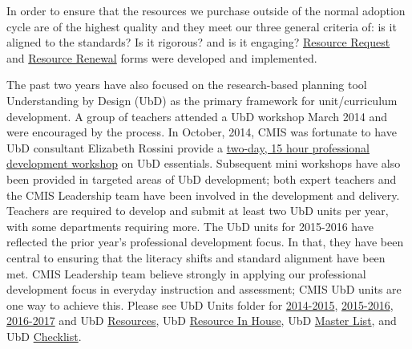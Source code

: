 \documentclass{report}
\begin{document}
\begin{findings}
In order to ensure that the resources we purchase outside of the normal adoption cycle are of the highest quality and they meet our three general criteria of: is it aligned to the standards? Is it rigorous? and is it engaging? \href{https://goo.gl/forms/715q4GLbzFj9JRPZ2}{Resource Request} and \href{https://goo.gl/forms/N2Oow0UnpUr7bOzw1}{Resource Renewal} forms were developed and implemented. 


The past two years have also focused on the research-based planning tool Understanding by Design (UbD) as the primary framework for unit/curriculum development. A group of teachers attended a UbD workshop March 2014 and were encouraged by the process. In October, 2014, CMIS was fortunate to have UbD consultant Elizabeth Rossini provide a \href{https://drive.google.com/drive/folders/0ByVFfrm0zfolbDlqWjhobkhDZkk?usp=sharing}{two-day, 15 hour professional development workshop} on UbD essentials. Subsequent mini workshops have also been provided in targeted areas of UbD development; both expert teachers and the CMIS Leadership team have been involved in the development and delivery. Teachers are required to develop and submit at least two UbD units per year, with some departments requiring more. The UbD units for 2015-2016 have reflected the prior year’s professional development focus. In that, they have been central to ensuring that the literacy shifts and standard alignment have been met. CMIS Leadership team believe strongly in applying our professional development focus in everyday instruction and assessment; CMIS UbD units are one way to achieve this. Please see UbD Units folder for \href{https://drive.google.com/drive/folders/0ByVFfrm0zfolQkFTQjNQMDhBN1E?usp=sharing}{2014-2015}, \href{https://drive.google.com/drive/folders/0ByVFfrm0zfolfl9RaFBtSy1YLVM2LUJONGNVcDAxbTZIWTNKTXVFZnh6eEUybjIwQi1RR3M?usp=sharing}{2015-2016}, \href{https://drive.google.com/drive/folders/0ByVFfrm0zfolak8xTjQ3NVhCbmc?usp=sharing}{2016-2017} and UbD \href{https://drive.google.com/a/cmis.ac.th/folderview?id=0ByVFfrm0zfolfmUyZV9DbGoxZVhpVHpGdG9MeEt6MHZJaEtoT3VzTjM0bkk5NFQ5MVJldUU&usp=sharing}{Resources}, UbD \href{https://drive.google.com/drive/folders/0ByVFfrm0zfolcXpjOUJTSmdIT1k?usp=sharing}{Resource In House}, UbD \href{https://docs.google.com/a/cmis.ac.th/document/d/1kL1VjwfuMMa7NaWmwUrEah1BM-jJRmLAd4VJzR3HoPs/edit?usp=sharing}{Master List}, and UbD \href{https://docs.google.com/a/cmis.ac.th/document/d/11IXUy-YcnFG8dMzr42iBigOuh1GmLVjcu_Ulv19r9Yg/edit?usp=sharing}{Checklist}. 


\end{findings}
\end{document}
